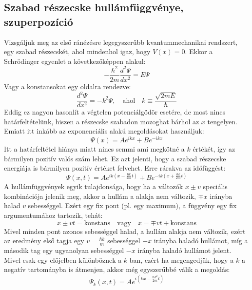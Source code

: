\documentclass[../main.tex]{subfiles}
\begin{document}
\subsection{Szabad részecske hullámfüggvénye, szuperpozíció}
Vizsgáljuk meg az első ránézésre legegyszerűbb kvantummechanikai rendszert, egy szabad részecskét, ahol mindenhol igaz, hogy $V(x) = 0$. Ekkor a Schrödinger egyenlet a következőképpen alakul:
\begin{equation}
    - \frac{\hbar^2}{2m} \frac{d^2 \Psi}{d x^2} = E \Psi
\end{equation}
Vagy a konstansokat egy oldalra rendezve:
\begin{equation}
    \frac{d^2 \Psi}{d x^2} = - k^2 \Psi, \quad \text{ahol} \quad k \equiv \frac{\sqrt{2mE}}{\hbar}
\end{equation}
Eddig ez nagyon hasonlít a végtelen potenciálgödör esetére, de most nincs határfeltételünk, hiszen a részecske szabadon mozoghat bárhol az $x$ tengelyen. Emiatt itt inkább az exponenciális alakú megoldásokat használjuk:
\begin{equation}
    \Psi(x) = A e^{i k x} + B e^{-i k x}
\end{equation}
Itt a határfeltétel hiánya miatt nincs semmi ami megkötné a $k$ értékét, így az bármilyen pozitív valós szám lehet. Ez azt jelenti, hogy a szabad részecske energiája is bármilyen pozitív értéket felvehet. 
Erre rárakva az időfüggést:
\begin{equation}
    \Psi(x,t) = A e^{i k (x - \frac{\hbar k}{2m}t)} + B e^{-i k (x + \frac{\hbar k}{2m}t)}
\end{equation}
A hullámfüggvények egyik tulajdonsága, hogy ha a változók $x \pm v$ speciális kombinációja jelenik meg, akkor a hullám a alakja nem változik, $\mp x$ irányba halad $v$ sebességgel.
Ezért egy fix pont (pl. egy maximum), a függvény egy fix argumentumához tartozik, tehát:
\begin{equation}
    x \pm vt = \text{konstans} \quad \text{vagy} \quad x = \mp vt + \text{konstans}
\end{equation}
Mivel minden pont azonos sebességgel halad, a hullám alakja nem változik, ezért az eredmény első tagja egy $v = \frac{\hbar k}{m}$ sebességgel $+x$ irányba haladó hullámot, míg a második tag egy ugyanolyan sebességgel $-x$ irányba haladó hullámot jelent.
Mivel csak egy előjelben különböznek a $k$-ban, ezért ha megengedjük, hogy a $k$ a negatív tartományba is átmenjen, akkor még egyszerűbbé válik a megoldás:
\begin{equation}
    \Psi_k(x,t) = A e^{i (kx - \frac{\hbar k^2}{2m}t)}
\end{equation}
\end{document}
